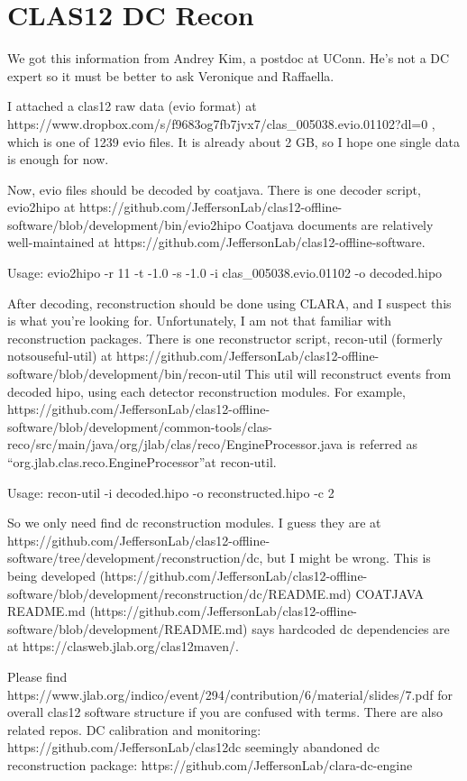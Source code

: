\section{CLAS12 DC Recon}
    We got this information from Andrey Kim, a postdoc at UConn.
    He’s not a DC expert so it must be better to ask Veronique and Raffaella.
    
    I attached a clas12 raw data (evio format) at https://www.dropbox.com/s/f9683og7fb7jvx7/clas_005038.evio.01102?dl=0
    , which is one of 1239 evio files.
    It is already about 2 GB, so I hope one single data is enough for now.
    
    Now, evio files should be decoded by coatjava. There is one decoder script, evio2hipo at https://github.com/JeffersonLab/clas12-offline-software/blob/development/bin/evio2hipo
    Coatjava documents are relatively well-maintained at https://github.com/JeffersonLab/clas12-offline-software.
    
    Usage: evio2hipo -r 11 -t -1.0 -s -1.0 -i clas_005038.evio.01102 -o decoded.hipo
    
    After decoding, reconstruction should be done using CLARA, and I suspect this is what you’re looking for.
    Unfortunately, I am not that familiar with reconstruction packages.
    There is one reconstructor script, recon-util (formerly notsouseful-util) at https://github.com/JeffersonLab/clas12-offline-software/blob/development/bin/recon-util
    This util will reconstruct events from decoded hipo, using each detector reconstruction modules.
    For example, https://github.com/JeffersonLab/clas12-offline-software/blob/development/common-tools/clas-reco/src/main/java/org/jlab/clas/reco/EngineProcessor.java
    is referred as “org.jlab.clas.reco.EngineProcessor”at recon-util.
    
    Usage: recon-util -i decoded.hipo -o reconstructed.hipo -c 2
    
    So we only need find dc reconstruction modules.
    I guess they are at  https://github.com/JeffersonLab/clas12-offline-software/tree/development/reconstruction/dc, but I might be wrong.
    This is being developed (https://github.com/JeffersonLab/clas12-offline-software/blob/development/reconstruction/dc/README.md)
    COATJAVA README.md (https://github.com/JeffersonLab/clas12-offline-software/blob/development/README.md) says hardcoded dc dependencies are at https://clasweb.jlab.org/clas12maven/.
    
    Please find https://www.jlab.org/indico/event/294/contribution/6/material/slides/7.pdf for overall clas12 software structure if you are confused with terms.
    There are also related repos.
    DC calibration and monitoring: https://github.com/JeffersonLab/clas12dc
    seemingly abandoned dc reconstruction package: https://github.com/JeffersonLab/clara-dc-engine
    
